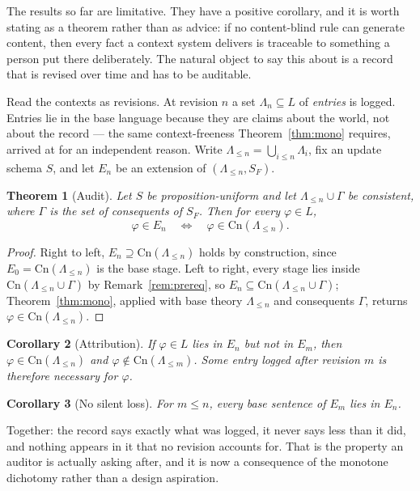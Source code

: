 \documentclass[11pt]{article}
\theoremstyle{plain}
\newtheorem{theorem}{Theorem}
\newtheorem{corollary}[theorem]{Corollary}
\theoremstyle{definition}
\theoremstyle{remark}
\newcommand{\Cn}{\mathrm{Cn}}
\begin{document}
The results so far are limitative. They have a positive corollary, and it is
worth stating as a theorem rather than as advice: if no content-blind rule can
generate content, then every fact a context system delivers is traceable to
something a person put there deliberately. The natural object to say this about
is a record that is revised over time and has to be auditable.

Read the contexts as revisions. At revision $n$ a set $\Lambda_n\subseteq L$ of
\emph{entries} is logged. Entries lie in the base language because they are
claims about the world, not about the record --- the same context-freeness
Theorem~\ref{thm:mono} requires, arrived at for an independent reason. Write
$\Lambda_{\le n}=\bigcup_{i\le n}\Lambda_i$, fix an update schema $S$, and let
$E_n$ be an extension of $(\Lambda_{\le n},S_F)$.

\begin{theorem}[Audit]\label{thm:audit}
Let $S$ be proposition-uniform and let $\Lambda_{\le n}\cup\Gamma$ be
consistent, where $\Gamma$ is the set of consequents of $S_F$. Then for every
$\varphi\in L$,
\[
\varphi\in E_n \quad\Longleftrightarrow\quad \varphi\in\Cn(\Lambda_{\le n}).
\]
\end{theorem}

\begin{proof}
Right to left, $E_n\supseteq\Cn(\Lambda_{\le n})$ holds by construction, since
$E_0=\Cn(\Lambda_{\le n})$ is the base stage. Left to right, every stage lies
inside $\Cn(\Lambda_{\le n}\cup\Gamma)$ by Remark~\ref{rem:prereq}, so
$E_n\subseteq\Cn(\Lambda_{\le n}\cup\Gamma)$; Theorem~\ref{thm:mono}, applied
with base theory $\Lambda_{\le n}$ and consequents $\Gamma$, returns
$\varphi\in\Cn(\Lambda_{\le n})$.
\end{proof}

\begin{corollary}[Attribution]\label{cor:attribution}
If $\varphi\in L$ lies in $E_n$ but not in $E_m$, then
$\varphi\in\Cn(\Lambda_{\le n})$ and $\varphi\notin\Cn(\Lambda_{\le m})$. Some
entry logged after revision $m$ is therefore necessary for $\varphi$.
\end{corollary}

\begin{corollary}[No silent loss]\label{cor:noloss}
For $m\le n$, every base sentence of $E_m$ lies in $E_n$.
\end{corollary}

Together: the record says exactly what was logged, it never says less than it
did, and nothing appears in it that no revision accounts for. That is the
property an auditor is actually asking after, and it is now a consequence of
the monotone dichotomy rather than a design aspiration.
\end{document}
